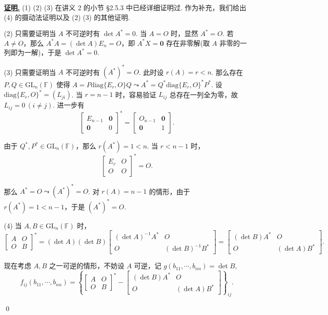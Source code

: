 \documentclass[10pt,openany]{article}
\theoremstyle{thmstyle} %
\theoremstyle{defstyle} %
\theoremstyle{prostyle} %
\theoremstyle{exastyle}
\theoremstyle{remstyle}
\renewenvironment{proof}[1][证明]{\par\underline{\textbf{#1.}} \;\fangsong}{\qed\par}
\newcommand{\gfn}{\text{GL}_n(\mathbb{F})}
\newcommand{\diag}{\mathrm{diag}}
\begin{document}
\begin{proof}
	(1) (2) (3) 在讲义 2 的小节 \S 2.5.3 中已经详细证明过. 作为补充，我们给出 (4) 的摄动法证明以及 (2) (3) 的其他证明.
	
	(2) 只需要证明当 \( A \) 不可逆时有 \( \det A^*=0 \). 当 \( A=O \) 时，显然 \( A^*=O \). 若 \( A \neq O \)，那么 \( A^*A=(\det A)E_n=O \)，即 \( A^*X=\bm{0} \) 存在非零解(取 \( A \) 非零的一列即为一解)，于是 \( \det A^*=0 \).
	
	(3) 只需要证明当 \( A \) 不可逆时有 \( (A^*)^*=O \). 此时设 \( r(A)=r<n \). 那么存在 \( P,Q \in \gfn \) 使得 \( A=P\diag\{E_r,O\}Q \leadsto A^*=Q^* \diag\{E_r,O\}^* P^* \). 设 \( \diag\{E_r,O\}^*=(L_{ji}) \). 当 \( r=n-1 \) 时，容易验证 \( L_{ij} \) 总存在一列全为零，故 \( L_{ij}=0 \ (i \neq j) \). 进一步有
	\[ \begin{bmatrix}
		E_{n-1} & \bm{0} \\
		\bm{0} & 0
	\end{bmatrix}^*=\begin{bmatrix}
	    O_{n-1} & \bm{0} \\
	    \bm{0} & 1  
	\end{bmatrix}. \]
	
	由于 \( Q^*,P^* \in \gfn \)，那么 \( r(A^*)=1<n \). 当 \( r<n-1 \) 时，
	\[ \begin{bmatrix}
		E_r & O \\
		O & O
	\end{bmatrix}^*=O. \]
	
	那么 \( A^*=O \leadsto (A^*)^*=O \). 对 \( r(A)=n-1 \) 的情形，由于 \( r(A^*)=1<n-1 \)，于是 \( (A^*)^*=O \). 
	
	(4) 当 \( A,B \in \gfn \) 时，
	\[ \begin{bmatrix}
		A & O \\
		O & B
	\end{bmatrix}^*=(\det A)(\det B) \begin{bmatrix}
	(\det A)^{-1} A^* & O \\
	O & (\det B)^{-1} B^*
	\end{bmatrix}= \begin{bmatrix}
	(\det B)A^* & O \\
	O & (\det A)B^*
	\end{bmatrix}. \]
	
	现在考虑 \( A,B \) 之一可逆的情形，不妨设 \( A \) 可逆，记 \( g(b_{11},\cdots,b_{nn})=\det B \),
	\[  f_{ij}(b_{11},\cdots,b_{nn})=\left\{ \begin{bmatrix}
		A & O \\
		O & B
	\end{bmatrix}^*-\begin{bmatrix}
		(\det B)A^* & O \\
		O & (\det A)B^*
	\end{bmatrix}\right\}_{ij}.  \] 


\end{proof}
\end{document}
